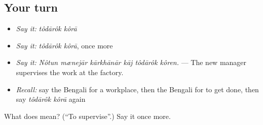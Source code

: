 \subsection*{Your turn}
\begin{itemize}
\raggedright
  \item \emph{Say it:} \emph{tôdārôk kôrā}
  \item \emph{Say it:} \emph{tôdārôk kôrā}, once more
  \item \emph{Say it:} \emph{Nôtun mænejār kārkhānār kāj tôdārôk kôren.} — The new manager supervises the work at the factory.
  \item \emph{Recall:} say the Bengali for a workplace, then the Bengali for to get done, then say \emph{tôdārôk kôrā} again
\end{itemize}

\begin{tcolorbox}[breakable,colback=teal!4,colframe=teal!35!black,title={Before you move on}]
What does   mean? (\textquotedblleft{}To supervise\textquotedblright{}.) Say it once more.
\end{tcolorbox}
